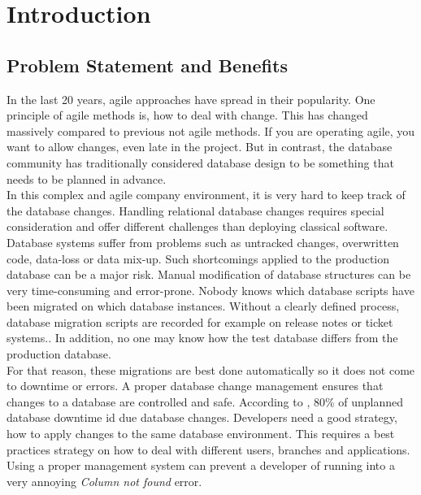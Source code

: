 


\chapter{Introduction}
\section{Problem Statement and Benefits}%
 
 In the last 20 years, agile approaches have spread in their popularity. One principle of agile methods is, how to deal with change. This has changed massively compared to previous not agile methods. If you are operating agile, you want to allow changes, even late in the project. But in contrast, the database community has traditionally considered database design to be something that needs to be planned in advance.\\
 
 In this complex and agile company environment, it is very hard to keep track of the database changes. Handling relational database changes requires special consideration and offer different challenges than deploying classical software. Database systems suffer from problems such as untracked changes, overwritten code, data-loss or data mix-up. Such shortcomings applied to the production database can be a major risk. Manual modification of database structures can be very time-consuming and error-prone. Nobody knows which database scripts have been migrated on which database instances. 
 Without a clearly defined process, database migration scripts are recorded for example on release notes or ticket systems..
In addition, no one may know how the test database differs from the production database.\\
 
 For that reason, these migrations are best done automatically so it does not come to downtime or errors. A proper database change management ensures that changes to a database are controlled and safe. According to \cite{ManageForce2016}, 80\% of unplanned database downtime id due database changes.
Developers need a good strategy, how to apply changes to the same database environment.
This requires a best practices strategy on how to deal with different users, branches and applications. Using a proper management system can prevent a developer of running into a very annoying \textit{Column not found} error.\\

